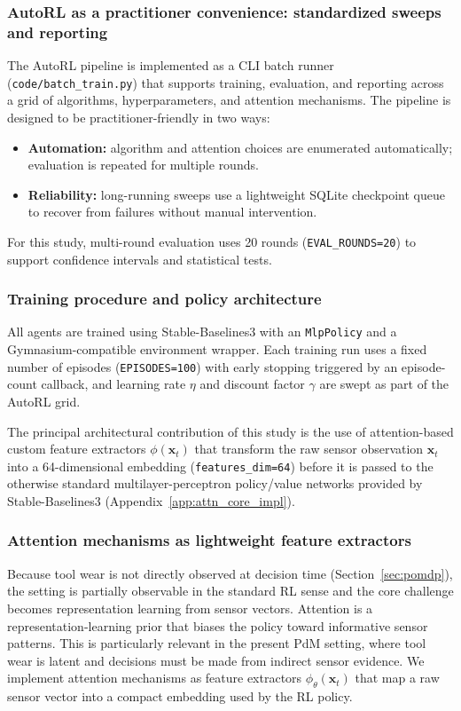 \documentclass[sn-basic]{sn-jnl} %
\begin{document}
\subsubsection{AutoRL as a practitioner convenience: standardized sweeps and reporting}
\label{sec:autorl}
The AutoRL pipeline is implemented as a CLI batch runner (\texttt{code/batch\_train.py}) that supports training, evaluation, and reporting across a grid of algorithms, hyperparameters, and attention mechanisms. The pipeline is designed to be practitioner-friendly in two ways:
\begin{itemize}
        \item \textbf{Automation:} algorithm and attention choices are enumerated automatically; evaluation is repeated for multiple rounds.
        \item \textbf{Reliability:} long-running sweeps use a lightweight SQLite checkpoint queue to recover from failures without manual intervention.
\end{itemize}
For this study, multi-round evaluation uses 20 rounds (\texttt{EVAL\_ROUNDS=20}) to support confidence intervals and statistical tests.

\subsubsection{Training procedure and policy architecture}
All agents are trained using Stable-Baselines3 with an \texttt{MlpPolicy} and a Gymnasium-compatible environment wrapper. Each training run uses a fixed number of episodes (\texttt{EPISODES=100}) with early stopping triggered by an episode-count callback, and learning rate $\eta$ and discount factor $\gamma$ are swept as part of the AutoRL grid.

The principal architectural contribution of this study is the use of attention-based custom feature extractors $\phi(\mathbf{x}_t)$ that transform the raw sensor observation $\mathbf{x}_t$ into a 64-dimensional embedding (\texttt{features\_dim=64}) before it is passed to the otherwise standard multilayer-perceptron policy/value networks provided by Stable-Baselines3 (Appendix~\ref{app:attn_core_impl}).

\subsubsection{Attention mechanisms as lightweight feature extractors}
\label{sec:attention}
Because tool wear is not directly observed at decision time (Section~\ref{sec:pomdp}), the setting is partially observable in the standard RL sense and the core challenge becomes representation learning from sensor vectors. Attention is a representation-learning prior that biases the policy toward informative sensor patterns. This is particularly relevant in the present PdM setting, where tool wear is latent and decisions must be made from indirect sensor evidence. We implement attention mechanisms as feature extractors $\phi_\theta(\mathbf{x}_t)$ that map a raw sensor vector into a compact embedding used by the RL policy.
\end{document}
